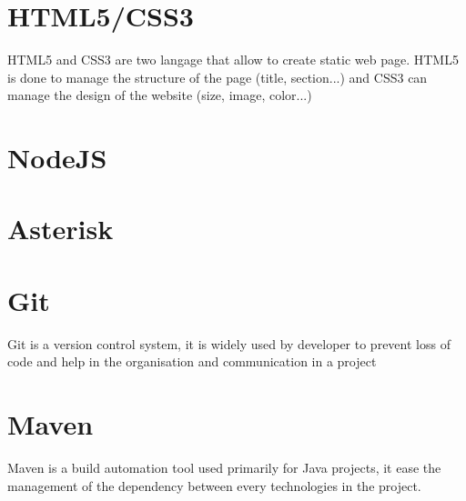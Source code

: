 \section{HTML5/CSS3}

HTML5 and CSS3 are two langage that allow to create static web page.
HTML5 is done to manage the structure of the page (title, section...) and CSS3 can manage the design of the website (size, image, color...)


\section{NodeJS}



\section{Asterisk}



\section{Git}

Git is a version control system, it is widely used by developer to prevent loss of code and help in the organisation and communication in a project


\section{Maven}

Maven is a build automation tool used primarily for Java projects, it ease the management of the dependency between every technologies in the project.


\newpage